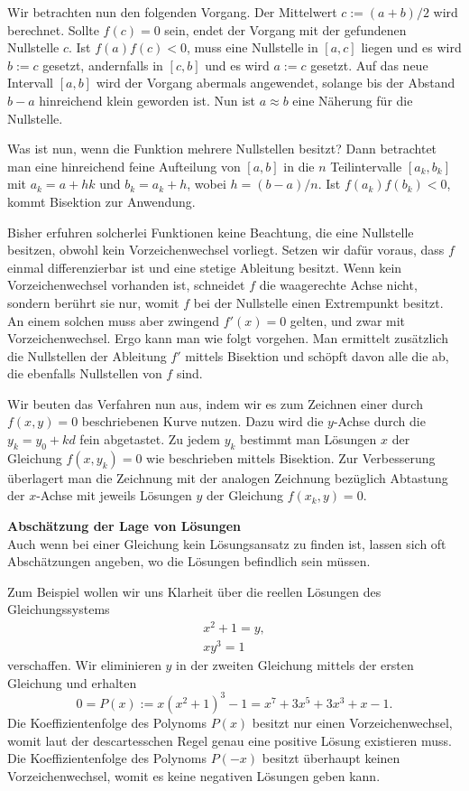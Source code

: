 \documentclass[paper=180mm:225mm,pagesize=auto,fleqn,twoside,11pt,dvipdfmx]{scrartcl}
\theoremstyle{rmbox}
\newenvironment{Rezept}[1]{\strong{#1}\\}{}
\newcommand{\strong}[1]{\textsf{\textbf{#1}}}
\begin{document}
Wir betrachten nun den folgenden Vorgang. Der Mittelwert $c := (a+b)/2$
wird berechnet. Sollte $f(c)=0$ sein, endet der Vorgang mit der
gefundenen Nullstelle $c$. Ist $f(a)f(c)<0$, muss eine Nullstelle
in $[a,c]$ liegen und es wird $b:=c$ gesetzt, andernfalls in $[c,b]$
und es wird $a:=c$ gesetzt. Auf das neue Intervall $[a,b]$ wird der Vorgang
abermals angewendet, solange bis der Abstand $b-a$ hinreichend klein
geworden ist. Nun ist $a\approx b$ eine Näherung für die
Nullstelle.

Was ist nun, wenn die Funktion mehrere Nullstellen besitzt?
Dann betrachtet man eine hinreichend feine Aufteilung von $[a,b]$ in
die $n$ Teilintervalle $[a_k,b_k]$ mit $a_k=a+hk$ und $b_k=a_k+h$, wobei
$h=(b-a)/n$. Ist $f(a_k)f(b_k)<0$, kommt Bisektion zur
Anwendung.

Bisher erfuhren solcherlei Funktionen keine Beachtung, die eine
Nullstelle besitzen, obwohl kein Vorzeichenwechsel vorliegt.
Setzen wir dafür voraus, dass $f$ einmal differenzierbar ist und
eine stetige Ableitung besitzt. Wenn kein Vorzeichenwechsel
vorhanden ist, schneidet $f$ die waagerechte Achse nicht,
sondern berührt sie nur, womit $f$ bei der Nullstelle einen
Extrempunkt besitzt. An einem solchen muss aber zwingend $f'(x)=0$
gelten, und zwar mit Vorzeichenwechsel. Ergo kann man wie folgt
vorgehen. Man ermittelt zusätzlich die Nullstellen der Ableitung $f'$
mittels Bisektion und schöpft davon alle die ab, die ebenfalls
Nullstellen von $f$ sind.

Wir beuten das Verfahren nun aus, indem wir es zum Zeichnen einer
durch $f(x,y)=0$ beschriebenen Kurve nutzen. Dazu wird die
$y$-Achse durch die $y_k=y_0+kd$ fein abgetastet. Zu jedem $y_k$
bestimmt man Lösungen $x$ der Gleichung $f(x,y_k)=0$ wie beschrieben
mittels Bisektion. Zur Verbesserung überlagert man die Zeichnung mit
der analogen Zeichnung bezüglich Abtastung der $x$-Achse mit jeweils
Lösungen $y$ der Gleichung $f(x_k,y)=0$.

\begin{Rezept}{Abschätzung der Lage von Lösungen}
Auch wenn bei einer Gleichung kein Lösungsansatz zu finden ist,
lassen sich oft Abschätzungen angeben, wo die Lösungen
befindlich sein müssen.
\end{Rezept}

\noindent
Zum Beispiel wollen wir uns Klarheit über die reellen Lösungen des
Gleichungssystems
\begin{gather*}
x^2 + 1 = y,\\
xy^3 = 1
\end{gather*}
verschaffen. Wir eliminieren $y$ in der zweiten Gleichung
mittels der ersten Gleichung und erhalten
\[0 = P(x) := x(x^2+1)^3 - 1 = x^7+3x^5+3x^3+x-1.\]
Die Koeffizientenfolge des Polynoms $P(x)$ besitzt nur einen
Vorzeichenwechsel, womit laut der descartesschen
Regel \cite{DR1}\cite{DR2} genau eine
positive Lösung existieren muss. Die Koeffizientenfolge des Polynoms
$P(-x)$ besitzt überhaupt keinen Vorzeichenwechsel, womit es
keine negativen Lösungen geben kann.
\end{document}
